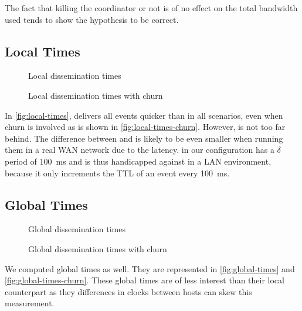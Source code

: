 The fact that killing the coordinator or not is of no effect on the total bandwidth used tends to show the hypothesis to be correct.
\subsection{Local Times}
\label{sub:local-times}
\begin{figure}[h]
	\centering
	
	\vspace{-2mm} 
	\caption{Local dissemination times}
	\vspace{-2mm}
	\label{fig:local-times} 
\end{figure}

\begin{figure}[h]
	\centering
	
	\vspace{-2mm} 
	\caption{Local dissemination times with churn}
	\vspace{-2mm} 
	\label{fig:local-times-churn} 
\end{figure}
In \autoref{fig:local-times}, \jgroups delivers all events quicker than \epto in all scenarios, even when churn is involved as is shown in \autoref{fig:local-times-churn}. However, \epto is not too far behind. The difference between \epto and \jgroups is likely to be even smaller when running them in a real WAN network due to the latency. \epto in our configuration has a $\delta$ period of \SI{100}{\milli\second} and is thus handicapped against \jgroups in a LAN environment, because it only increments the TTL of an event every \SI{100}{\milli\second}.
\newpage
\subsection{Global Times}
\begin{figure}[h]
	\centering
	
	\vspace{-2mm} 
	\caption{Global dissemination times}
	\vspace{-2mm}
	\label{fig:global-times}  
\end{figure}

\begin{figure}[h]
	\centering
	
	\vspace{-2mm} 
	\caption{Global dissemination times with churn}
	\vspace{-2mm} 
	\label{fig:global-times-churn} 
\end{figure}
We computed global times as well. They are represented in \autoref{fig:global-times} and \autoref{fig:global-times-churn}. These global times are of less interest than their local counterpart as they differences in clocks between hosts can skew this measurement.

